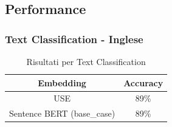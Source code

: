 \subsection{Performance}
\renewcommand{\arraystretch}{2}
\subsubsection{Text Classification - Inglese}
\begin{table}[hbt!]
    \centering
    \begin{tabular}{|c|c|}
      \hline
          Embedding & Accuracy  \\
      \hline
             USE    &   89\%    \\
      \hline
        Sentence BERT (base\_case)    &   89\%   \\
      \hline
    \end{tabular}
    
    \caption{Risultati per Text Classification}
    \label{tab:textc_results}
\end{table}

